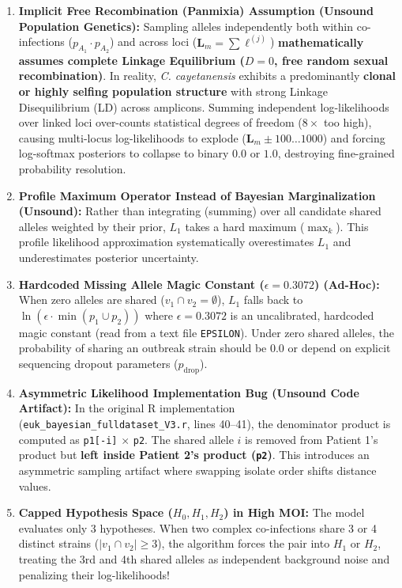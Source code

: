 \documentclass[11pt,a4paper]{article}
\begin{document}
\begin{enumerate}[leftmargin=*]
    \item \textbf{Implicit Free Recombination (Panmixia) Assumption (Unsound Population Genetics):} Sampling alleles independently both within co-infections ($p_{A_1} \cdot p_{A_2}$) and across loci ($\mathbf{L}_m = \sum \ell^{(j)}$) \textbf{mathematically assumes complete Linkage Equilibrium ($D=0$, free random sexual recombination)}. In reality, \textit{C. cayetanensis} exhibits a predominantly \textbf{clonal or highly selfing population structure} with strong Linkage Disequilibrium (LD) across amplicons. Summing independent log-likelihoods over linked loci over-counts statistical degrees of freedom ($8\times$ too high), causing multi-locus log-likelihoods to explode ($\mathbf{L}_m \pm 100 \dots 1000$) and forcing log-softmax posteriors to collapse to binary $0.0$ or $1.0$, destroying fine-grained probability resolution.
    \item \textbf{Profile Maximum Operator Instead of Bayesian Marginalization (Unsound):} Rather than integrating (summing) over all candidate shared alleles weighted by their prior, $L_1$ takes a hard maximum ($\max_{k}$). This profile likelihood approximation systematically overestimates $L_1$ and underestimates posterior uncertainty.
    \item \textbf{Hardcoded Missing Allele Magic Constant ($\epsilon = 0.3072$) (Ad-Hoc):} When zero alleles are shared ($v_1 \cap v_2 = \emptyset$), $L_1$ falls back to $\ln(\epsilon \cdot \min(p_1 \cup p_2))$ where $\epsilon = 0.3072$ is an uncalibrated, hardcoded magic constant (read from a text file \texttt{EPSILON}). Under zero shared alleles, the probability of sharing an outbreak strain should be 0.0 or depend on explicit sequencing dropout parameters ($p_{\text{drop}}$).
    \item \textbf{Asymmetric Likelihood Implementation Bug (Unsound Code Artifact):} In the original R implementation (\texttt{euk\_bayesian\_fulldataset\_V3.r}, lines 40--41), the denominator product is computed as \texttt{p1[-i]} $\times$ \texttt{p2}. The shared allele $i$ is removed from Patient 1's product but \textbf{left inside Patient 2's product (\texttt{p2})}. This introduces an asymmetric sampling artifact where swapping isolate order shifts distance values.
    \item \textbf{Capped Hypothesis Space ($H_0, H_1, H_2$) in High MOI:} The model evaluates only 3 hypotheses. When two complex co-infections share 3 or 4 distinct strains ($|v_1 \cap v_2| \ge 3$), the algorithm forces the pair into $H_1$ or $H_2$, treating the 3rd and 4th shared alleles as independent background noise and penalizing their log-likelihoods!

\end{enumerate}
\end{document}
